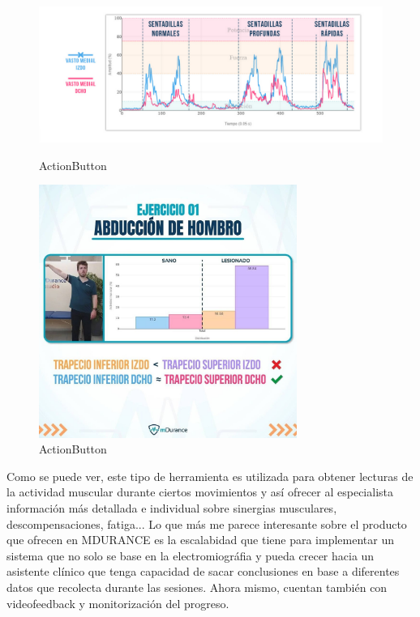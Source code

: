 \begin{figure}[hp!]
\begin{center}
    \includegraphics[width=1\textwidth]{imaxes/mdurance1.png}
    \caption{ActionButton}
    
    \vspace{1cm}

    \includegraphics[width=0.75\textwidth]{imaxes/mdurance2.jpg}
   \vspace{0.1cm}
    \caption{ActionButton}
    \label{ActionButton}
  \end{center}
\end{figure}



Como se puede ver, este tipo de herramienta es utilizada para obtener lecturas de la actividad muscular durante ciertos movimientos y así ofrecer al especialista información más detallada e individual sobre sinergias musculares, descompensaciones, fatiga... 
Lo que más me parece interesante sobre el producto que ofrecen en MDURANCE es la escalabidad que tiene para implementar un sistema que no solo se base en la electromiográfia y pueda crecer hacia un asistente clínico que tenga capacidad de sacar conclusiones en base a diferentes datos que recolecta durante las sesiones. Ahora mismo, cuentan también con videofeedback y monitorización del progreso. 

